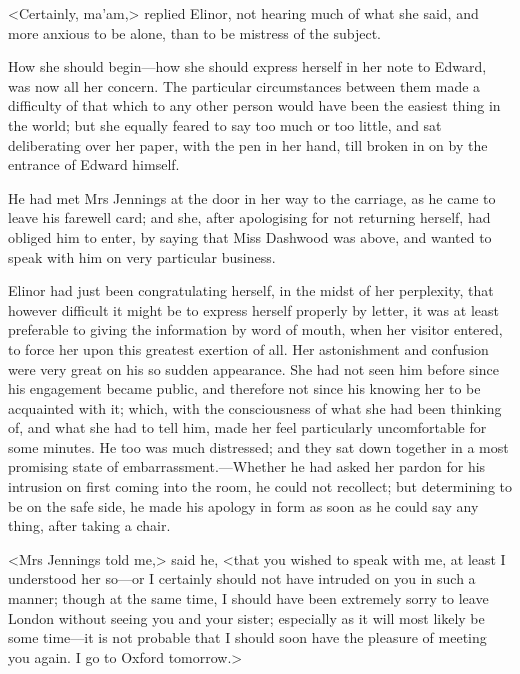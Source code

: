 <Certainly, ma'am,> replied Elinor, not hearing much of what she said, and more anxious to be alone, than to be mistress of the subject.

How she should begin—how she should express herself in her note to Edward, was now all her concern. The particular circumstances between them made a difficulty of that which to any other person would have been the easiest thing in the world; but she equally feared to say too much or too little, and sat deliberating over her paper, with the pen in her hand, till broken in on by the entrance of Edward himself.

He had met Mrs Jennings at the door in her way to the carriage, as he came to leave his farewell card; and she, after apologising for not returning herself, had obliged him to enter, by saying that Miss Dashwood was above, and wanted to speak with him on very particular business.

Elinor had just been congratulating herself, in the midst of her perplexity, that however difficult it might be to express herself properly by letter, it was at least preferable to giving the information by word of mouth, when her visitor entered, to force her upon this greatest exertion of all. Her astonishment and confusion were very great on his so sudden appearance. She had not seen him before since his engagement became public, and therefore not since his knowing her to be acquainted with it; which, with the consciousness of what she had been thinking of, and what she had to tell him, made her feel particularly uncomfortable for some minutes. He too was much distressed; and they sat down together in a most promising state of embarrassment.—Whether he had asked her pardon for his intrusion on first coming into the room, he could not recollect; but determining to be on the safe side, he made his apology in form as soon as he could say any thing, after taking a chair.

<Mrs Jennings told me,> said he, <that you wished to speak with me, at least I understood her so—or I certainly should not have intruded on you in such a manner; though at the same time, I should have been extremely sorry to leave London without seeing you and your sister; especially as it will most likely be some time—it is not probable that I should soon have the pleasure of meeting you again. I go to Oxford tomorrow.>

